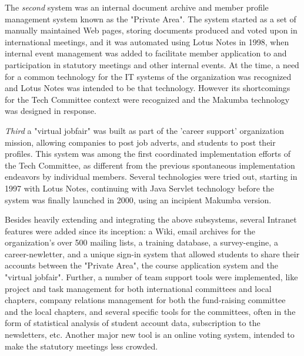 \documentclass{llncs}
\begin{document}
The {\it second} system was an internal document archive and member profile management system known as the "Private Area". The system started as a set of manually maintained Web pages, storing documents produced and voted upon in international meetings, and it was automated using Lotus Notes in 1998, when internal event management was added to facilitate member application to and participation in statutory meetings and other internal events. At the time, a need for a common technology for the IT systems of the organization was recognized and Lotus Notes was intended to be that technology. However its shortcomings for the Tech Committee context were recognized and the Makumba technology was designed in response.

{\it Third} a "virtual jobfair" was built as part of the 'career support' organization mission,  allowing companies to post job adverts, and students to post their profiles. This system was among the first coordinated implementation efforts of the Tech Committee, as different from the previous spontaneous implementation endeavors by individual members. Several technologies were tried out, starting in 1997 with Lotus Notes, continuing with Java Servlet technology before the system was finally launched in 2000, using an incipient Makumba version.

Besides heavily extending and integrating the above subsystems, several Intranet features were added since its inception: a Wiki, email archives for the organization's over 500 mailing lists, a training database, a survey-engine, a career-newletter, and a unique sign-in system that allowed students to share their accounts between the "Private Area", the course application system and the "virtual jobfair". Further, a number of team support tools were implemented, like project and task management for both international committees and local chapters, company relations management for both the fund-raising committee and the local chapters, and several specific tools for the committees, often in the form of statistical analysis of student account data, subscription to the newsletters, etc. Another major new tool is an online voting system, intended to make the statutory meetings less crowded.
\end{document}
